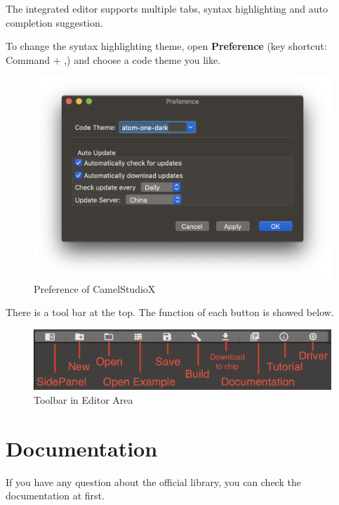 \documentclass{article}
\begin{document}
			The integrated editor supports multiple tabs, syntax highlighting and auto completion suggestion.
			
			To change the syntax highlighting theme, open \textbf{Preference} (key shortcut: Command + ,) and choose a code theme you like.
			
			\begin{figure}[h]
				\centering
				\includegraphics[width=\textwidth]{Preference}
				\caption{Preference of CamelStudioX}
			\end{figure}
			
			There is a tool bar at the top. The function of each button is showed below.
			
			\begin{figure}[h]
				\centering
				\includegraphics[width=\textwidth]{ToolBar}
				\caption{Toolbar in Editor Area}
			\end{figure}
			
	\newpage
	\section{Documentation}
	
		If you have any question about the official library, you can check the documentation at first.
		
\end{document}
